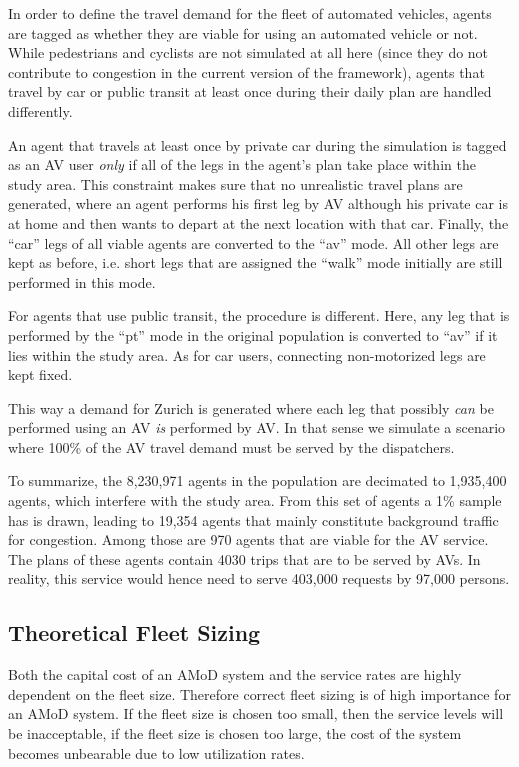 In order to define the travel demand for the fleet of automated vehicles, agents
are tagged as whether they are viable for using an automated vehicle or not.
While pedestrians and cyclists are not simulated at all here (since they do not
contribute to congestion in the current version of the framework), agents that
travel by car or public transit at least once during their daily plan are
handled differently.

An agent that travels at least once by private car during the simulation is tagged
as an AV user \textit{only} if all of the legs in the agent's plan take place
within the study area. This constraint makes sure that no unrealistic travel
plans are generated, where an agent performs his first leg by AV although his
private car is at home and then wants to depart at the next location with that
car. Finally, the ``car'' legs of all viable agents are converted to the ``av'' mode.
All other legs are kept as before, i.e. short legs that are assigned the ``walk''
mode initially are still performed in this mode.

For agents that use public transit, the procedure is different. Here, any leg
that is performed by the ``pt'' mode in the original population is converted to ``av''
if it lies within the study area. As for car users, connecting non-motorized
legs are kept fixed.

This way a demand for Zurich is generated where each leg that possibly
\textit{can} be performed using an AV \textit{is} performed by AV. In that sense we
simulate a scenario where 100\% of the AV travel demand must be served by the
dispatchers.

To summarize, the 8,230,971 agents in the population are decimated to
1,935,400 agents, which interfere with the study area. From this set of agents
a 1\% sample has is drawn, leading to 19,354 agents that mainly constitute
background traffic for congestion. Among those are 970 agents that are viable for the AV
service. The plans of these agents contain 4030 trips that are to be served by
AVs. In reality, this service would hence need to serve 403,000 requests by
97,000 persons.

\subsection{Theoretical Fleet Sizing}

Both the capital cost of an AMoD system and the service rates are highly dependent on the fleet size. Therefore correct fleet sizing is of high importance for an AMoD system. If the fleet size is chosen too small, then the service levels will be inacceptable, if the fleet size is chosen too large, the cost of the system becomes unbearable due to low utilization rates. 

